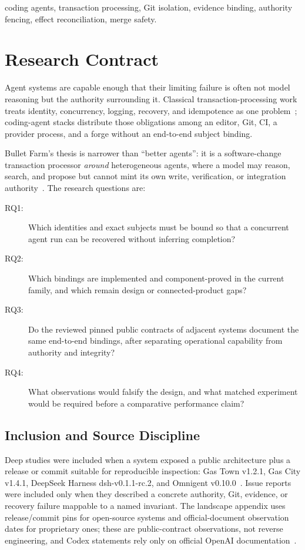 \documentclass[journal]{IEEEtran}
\begin{document}
\begin{IEEEkeywords}
coding agents, transaction processing, Git isolation, evidence binding,
authority fencing, effect reconciliation, merge safety.
\end{IEEEkeywords}

\section{Research Contract}
\label{sec:contract}

Agent systems are capable enough that their limiting failure is often not
model reasoning but the authority surrounding it. Classical
transaction-processing work treats identity, concurrency, logging, recovery,
and idempotence as one problem~\cite{gray1981,gray1993,helland2012};
coding-agent stacks distribute those obligations among an editor, Git, CI, a
provider process, and a forge without an end-to-end subject binding.

Bullet Farm's thesis is narrower than ``better agents'': it is a
software-change transaction processor \emph{around} heterogeneous agents,
where a model may reason, search, and propose but cannot mint its own write,
verification, or integration authority~\cite{bulletOverview}. The research
questions are:

\begin{description}
\item[RQ1:] Which identities and exact subjects must be bound so that a
concurrent agent run can be recovered without inferring completion?
\item[RQ2:] Which bindings are implemented and component-proved in the current
family, and which remain design or connected-product gaps?
\item[RQ3:] Do the reviewed pinned public contracts of adjacent systems
document the same end-to-end bindings, after separating operational capability
from authority and integrity?
\item[RQ4:] What observations would falsify the design, and what matched
experiment would be required before a comparative performance claim?
\end{description}

\subsection{Inclusion and Source Discipline}

Deep studies were included when a system exposed a public architecture plus a
release or commit suitable for reproducible inspection: Gas Town v1.2.1, Gas
City v1.4.1, DeepSeek Harness dsh-v0.1.1-rc.2, and Omnigent
v0.10.0~\cite{gastownV121,gascityV141,dshV011,omnigentV010}. Issue reports
were included only when they described a concrete authority, Git, evidence, or
recovery failure mappable to a named invariant. The landscape appendix uses
release/commit pins for open-source systems and official-document observation
dates for proprietary ones; these are public-contract observations, not
reverse engineering, and Codex statements rely only on official OpenAI
documentation~\cite{openaiCodexCli,openaiCodexCloud}.
\end{document}
